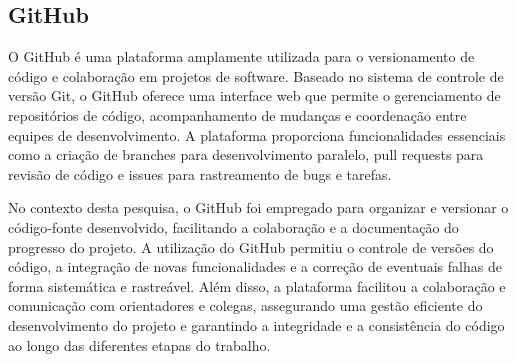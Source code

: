 \subsection{GitHub}

O GitHub é uma plataforma amplamente utilizada para o versionamento de código e colaboração em projetos de software. Baseado no sistema de controle de versão Git, o GitHub oferece uma interface web que permite o gerenciamento de repositórios de código, acompanhamento de mudanças e coordenação entre equipes de desenvolvimento. A plataforma proporciona funcionalidades essenciais como a criação de branches para desenvolvimento paralelo, pull requests para revisão de código e issues para rastreamento de bugs e tarefas. 

No contexto desta pesquisa, o GitHub foi empregado para organizar e versionar o código-fonte desenvolvido, facilitando a colaboração e a documentação do progresso do projeto. A utilização do GitHub permitiu o controle de versões do código, a integração de novas funcionalidades e a correção de eventuais falhas de forma sistemática e rastreável. Além disso, a plataforma facilitou a colaboração e comunicação com orientadores e colegas, assegurando uma gestão eficiente do desenvolvimento do projeto e garantindo a integridade e a consistência do código ao longo das diferentes etapas do trabalho.